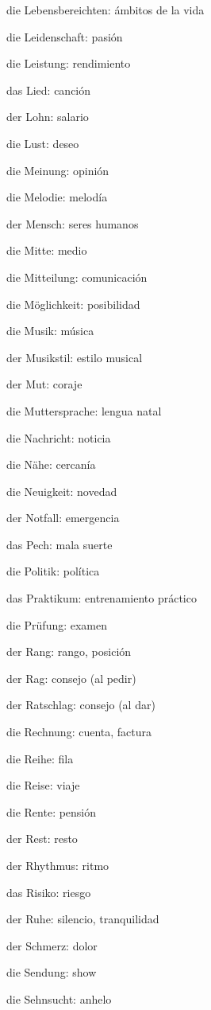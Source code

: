 \begin{multicols}{2}
\begin{myitemize}
\item die Lebensbereichten: ámbitos de la vida
\item die Leidenschaft: pasión
\item die Leistung: rendimiento
\item das Lied: canción
\item der Lohn: salario
\item die Lust: deseo
\item die Meinung: opinión
\item die Melodie: melodía
\item der Mensch: seres humanos
\item die Mitte: medio
\item die Mitteilung: comunicación
\item die Möglichkeit: posibilidad
\item die Musik: música
\item der Musikstil: estilo musical
\item der Mut: coraje
\item die Muttersprache: lengua natal
\item die Nachricht: noticia
\item die Nähe: cercanía
\item die Neuigkeit: novedad
\item der Notfall: emergencia
\item das Pech: mala suerte
\item die Politik: política
\item das Praktikum: entrenamiento práctico
\item die Prüfung: examen
\item der Rang: rango, posición
\item der Rag: consejo (al pedir)
\item der Ratschlag: consejo (al dar)
\item die Rechnung: cuenta, factura
\item die Reihe: fila
\item die Reise: viaje
\item die Rente: pensión
\item der Rest: resto
\item der Rhythmus: ritmo
\item das Risiko: riesgo
\item der Ruhe: silencio, tranquilidad
\item der Schmerz: dolor
\item die Sendung: show
\item die Sehnsucht: anhelo

\end{myitemize}
\end{multicols}
